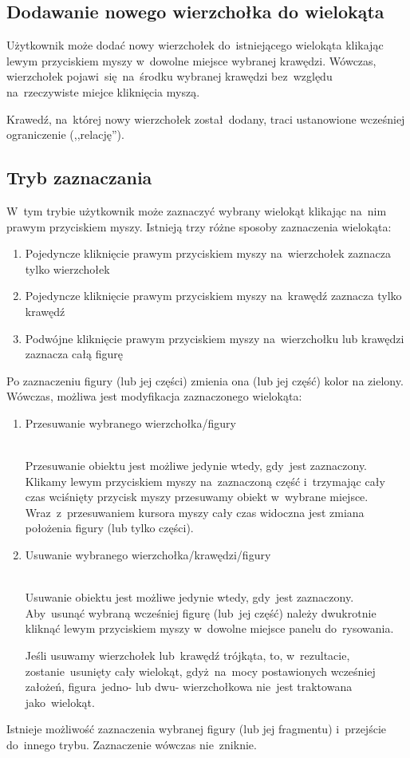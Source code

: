 \documentclass[11pt, a4paper]{article}
\begin{document}
 \hypertarget{AddNewVertex}{\subsection{Dodawanie nowego wierzchołka do wielokąta}}
 Użytkownik może dodać nowy wierzchołek do~istniejącego wielokąta klikając lewym przyciskiem myszy
 w~dowolne miejsce wybranej krawędzi.
 Wówczas, wierzchołek pojawi~się na~środku wybranej krawędzi bez~względu na~rzeczywiste miejce kliknięcia myszą.
 
 Krawedź, na~której nowy wierzchołek został dodany, traci ustanowione wcześniej ograniczenie (,,relację'').
 
 \hypertarget{Select}{\subsection{Tryb zaznaczania}}
 W~tym trybie użytkownik może zaznaczyć wybrany wielokąt klikając na~nim prawym przyciskiem myszy.
 Istnieją trzy różne sposoby zaznaczenia wielokąta:
 \begin{enumerate}
    \item Pojedyncze kliknięcie prawym przyciskiem myszy na~wierzchołek zaznacza tylko wierzchołek
    \item Pojedyncze kliknięcie prawym przyciskiem myszy na~krawędź zaznacza tylko krawędź
    \item Podwójne kliknięcie prawym przyciskiem myszy na~wierzchołku lub krawędzi zaznacza całą figurę
 \end{enumerate}
 Po zaznaczeniu figury (lub jej części) zmienia ona (lub jej część) kolor na zielony.
 Wówczas, możliwa jest modyfikacja zaznaczonego wielokąta:
 \begin{enumerate}
  \item \hypertarget{Move}{Przesuwanie wybranego wierzchołka/figury} \\
    Przesuwanie obiektu jest możliwe jedynie wtedy, gdy~jest zaznaczony.
    Klikamy lewym przyciskiem myszy na~zaznaczoną część
    i~trzymając cały czas wciśnięty przycisk myszy przesuwamy obiekt w~wybrane miejsce. 
    Wraz~z~przesuwaniem kursora myszy cały czas widoczna jest zmiana położenia figury (lub tylko części).
  \item \hypertarget{Delete}{Usuwanie wybranego wierzchołka/krawędzi/figury} \\
    Usuwanie obiektu jest możliwe jedynie wtedy, gdy~jest zaznaczony.
    Aby~usunąć wybraną wcześniej figurę (lub~jej część)
    należy dwukrotnie kliknąć lewym przyciskiem myszy w~dowolne miejsce panelu do~rysowania.
    
    Jeśli usuwamy wierzchołek lub~krawędź trójkąta, to, w~rezultacie, zostanie~usunięty cały wielokąt,
    gdyż~na~mocy postawionych wcześniej założeń, figura~jedno- lub dwu- wierzchołkowa nie~jest traktowana
    jako~wielokąt.
 \end{enumerate}
 Istnieje możliwość zaznaczenia wybranej figury (lub jej fragmentu) i~przejście do~innego trybu. Zaznaczenie wówczas
 nie~zniknie. 
 
\end{document}
